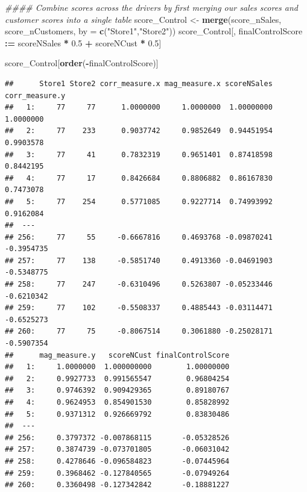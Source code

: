 \documentclass[
]{article}
\newenvironment{Shaded}{\begin{snugshade}}{\end{snugshade}}
\newcommand{\CommentTok}[1]{\textcolor[rgb]{0.56,0.35,0.01}{\textit{#1}}}
\newcommand{\DataTypeTok}[1]{\textcolor[rgb]{0.13,0.29,0.53}{#1}}
\newcommand{\ErrorTok}[1]{\textcolor[rgb]{0.64,0.00,0.00}{\textbf{#1}}}
\newcommand{\FloatTok}[1]{\textcolor[rgb]{0.00,0.00,0.81}{#1}}
\newcommand{\KeywordTok}[1]{\textcolor[rgb]{0.13,0.29,0.53}{\textbf{#1}}}
\newcommand{\NormalTok}[1]{#1}
\newcommand{\OperatorTok}[1]{\textcolor[rgb]{0.81,0.36,0.00}{\textbf{#1}}}
\newcommand{\StringTok}[1]{\textcolor[rgb]{0.31,0.60,0.02}{#1}}
\begin{document}
\begin{Shaded}
\begin{Highlighting}[]
\CommentTok{#### Combine scores across the drivers by first merging our sales scores and customer scores into a single table}
\NormalTok{score_Control <-}\StringTok{ }\KeywordTok{merge}\NormalTok{(score_nSales, score_nCustomers, }\DataTypeTok{by =} \KeywordTok{c}\NormalTok{(}\StringTok{"Store1"}\NormalTok{,}\StringTok{"Store2"}\NormalTok{))}
\NormalTok{score_Control[, finalControlScore }\OperatorTok{:}\ErrorTok{=}\StringTok{ }\NormalTok{scoreNSales }\OperatorTok{*}\StringTok{ }\FloatTok{0.5} \OperatorTok{+}\StringTok{ }\NormalTok{scoreNCust }\OperatorTok{*}\StringTok{ }\FloatTok{0.5}\NormalTok{]}
\end{Highlighting}
\end{Shaded}

\begin{Shaded}
\begin{Highlighting}[]
\NormalTok{score_Control[}\KeywordTok{order}\NormalTok{(}\OperatorTok{-}\NormalTok{finalControlScore)]}
\end{Highlighting}
\end{Shaded}

\begin{verbatim}
##      Store1 Store2 corr_measure.x mag_measure.x scoreNSales corr_measure.y
##   1:     77     77      1.0000000     1.0000000  1.00000000      1.0000000
##   2:     77    233      0.9037742     0.9852649  0.94451954      0.9903578
##   3:     77     41      0.7832319     0.9651401  0.87418598      0.8442195
##   4:     77     17      0.8426684     0.8806882  0.86167830      0.7473078
##   5:     77    254      0.5771085     0.9227714  0.74993992      0.9162084
##  ---                                                                      
## 256:     77     55     -0.6667816     0.4693768 -0.09870241     -0.3954735
## 257:     77    138     -0.5851740     0.4913360 -0.04691903     -0.5348775
## 258:     77    247     -0.6310496     0.5263807 -0.05233446     -0.6210342
## 259:     77    102     -0.5508337     0.4885443 -0.03114471     -0.6525273
## 260:     77     75     -0.8067514     0.3061880 -0.25028171     -0.5907354
##      mag_measure.y   scoreNCust finalControlScore
##   1:     1.0000000  1.000000000        1.00000000
##   2:     0.9927733  0.991565547        0.96804254
##   3:     0.9746392  0.909429365        0.89180767
##   4:     0.9624953  0.854901530        0.85828992
##   5:     0.9371312  0.926669792        0.83830486
##  ---                                             
## 256:     0.3797372 -0.007868115       -0.05328526
## 257:     0.3874739 -0.073701805       -0.06031042
## 258:     0.4278646 -0.096584823       -0.07445964
## 259:     0.3968462 -0.127840565       -0.07949264
## 260:     0.3360498 -0.127342842       -0.18881227
\end{verbatim}
\end{document}
